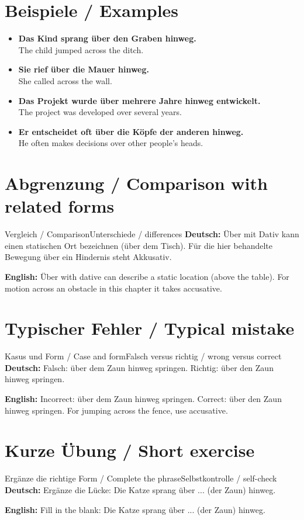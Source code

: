 \documentclass[a4paper,11pt]{article}
\newcommand{\GermanText}[1]{\textbf{Deutsch: }#1\par}
\newcommand{\EnglishText}[1]{{\small\color{SoftGray}\textbf{English: }#1\par}}
\newcommand{\ExampleItem}[2]{\item \textbf{#1}\\{\small\color{SoftGray}#2}}
\begin{document}
\section{Beispiele / Examples}
\begin{exbox}
\begin{itemize}
\ExampleItem{Das Kind sprang über den Graben hinweg.}{The child jumped across the ditch.}
\ExampleItem{Sie rief über die Mauer hinweg.}{She called across the wall.}
\ExampleItem{Das Projekt wurde über mehrere Jahre hinweg entwickelt.}{The project was developed over several years.}
\ExampleItem{Er entscheidet oft über die Köpfe der anderen hinweg.}{He often makes decisions over other people's heads.}
\end{itemize}
\end{exbox}
\section{Abgrenzung / Comparison with related forms}
\begin{grammarentry}{Vergleich / Comparison}{Unterschiede / differences}
\GermanText{Über mit Dativ kann einen statischen Ort bezeichnen (über dem Tisch). Für die hier behandelte Bewegung über ein Hindernis steht Akkusativ.}
\EnglishText{Über with dative can describe a static location (above the table). For motion across an obstacle in this chapter it takes accusative.}
\end{grammarentry}
\section{Typischer Fehler / Typical mistake}
\begin{grammarentry}{Kasus und Form / Case and form}{Falsch versus richtig / wrong versus correct}
\GermanText{Falsch: über dem Zaun hinweg springen. Richtig: über den Zaun hinweg springen.}
\EnglishText{Incorrect: über dem Zaun hinweg springen. Correct: über den Zaun hinweg springen. For jumping across the fence, use accusative.}
\end{grammarentry}
\section{Kurze Übung / Short exercise}
\begin{grammarentry}{Ergänze die richtige Form / Complete the phrase}{Selbstkontrolle / self-check}
\GermanText{Ergänze die Lücke: Die Katze sprang über ... (der Zaun) hinweg.}
\EnglishText{Fill in the blank: Die Katze sprang über ... (der Zaun) hinweg.}
\end{grammarentry}
\end{document}
